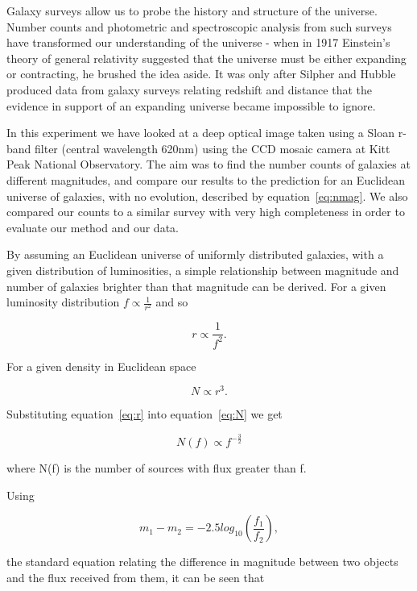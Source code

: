 \documentclass[a4paper,11pt,twoside]{article}
\begin{document}
Galaxy surveys allow us to probe the history and structure of the 
universe. Number counts and photometric and spectroscopic analysis 
from such surveys have transformed our understanding of the universe - 
when in 1917 Einstein's theory of general relativity suggested that 
the universe must be either expanding or contracting, he brushed the 
idea aside. It was only after Silpher and Hubble produced data from 
galaxy surveys relating redshift and distance that the evidence in 
support of an expanding universe became impossible to ignore\cite{raine}.

In this experiment we have looked at a deep optical image taken using a 
Sloan r-band filter (central wavelength 620nm) using the CCD mosaic 
camera at Kitt Peak National Observatory. The aim was to find the 
number counts of galaxies at different magnitudes, and compare our 
results to the prediction for an Euclidean universe of galaxies, 
with no evolution, described by equation~\ref{eq:nmag}. We also 
compared our counts to a similar survey with very high completeness 
in order to evaluate our method and our data.

By assuming an Euclidean universe of uniformly distributed galaxies, 
with a given distribution of luminosities, a simple relationship 
between magnitude and number of galaxies brighter than that magnitude 
can be derived. For a given luminosity distribution
\(f \propto \frac{1}{r^2}\) and so

\begin{equation}
\label{eq:r}
r \propto \frac{1}{f^2}.
\end{equation} 

For a given density in Euclidean space

\begin{equation}
\label{eq:N}
N \propto r^3.
\end{equation}

Substituting equation~\ref{eq:r} into equation~\ref{eq:N} we get

\begin{equation}
N(f) \propto f^{-\frac{3}{2}}
\end{equation}

where N(f) is the number of sources with flux greater than f.

Using

\begin{equation}
m_1 - m_2 = -2.5log_{10}(\frac{f_1}{f_2}),
\end{equation}


the standard equation relating the difference in magnitude 
between two objects and the flux received from them, it can be seen that
\end{document}
